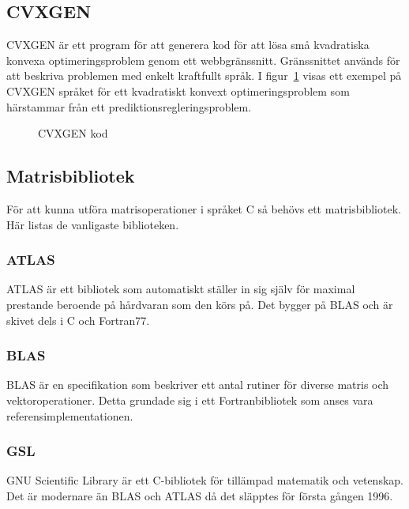 \subsection{CVXGEN}
CVXGEN är ett program för att generera kod för att lösa små kvadratiska konvexa optimeringsproblem genom ett webbgränssnitt. Gränssnittet används för att beskriva problemen med enkelt kraftfullt språk. \citep{cvxgen} \newline
\newline
I figur~\ref{fig:cvxgen} visas ett exempel på CVXGEN språket för ett kvadratiskt konvext optimeringsproblem som härstammar från ett prediktionsregleringsproblem.   

\begin{figure}[H]

\caption{CVXGEN kod \citep{cvxgen2}}
\label{fig:cvxgen}
\end{figure}  


\subsection{Matrisbibliotek}
För att kunna utföra matrisoperationer i språket C så behövs ett matrisbibliotek. Här listas de vanligaste biblioteken.
\subsubsection{ATLAS}
ATLAS är ett bibliotek som automatiskt ställer in sig själv för maximal prestande beroende på hårdvaran som den körs på. Det bygger på BLAS och är skivet dels i C och Fortran77.\citep{ATLAS}
\subsubsection{BLAS}
BLAS är en specifikation som beskriver ett antal rutiner för diverse matris och vektoroperationer. Detta grundade sig i ett Fortranbibliotek som anses vara referensimplementationen.\citep{BLAS}
\subsubsection{GSL}
GNU Scientific Library är ett C-bibliotek för tillämpad matematik och vetenskap. Det är modernare än BLAS och ATLAS då det släpptes för första gången 1996.\citep{GNU}


